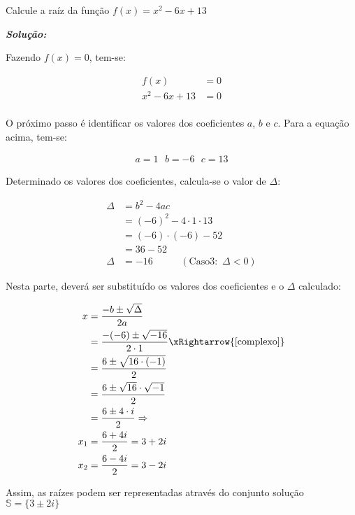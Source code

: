 \begin{example}\label{caso3} Calcule a raíz da função $f(x)=x^2-6x+13$
	
	\textit{\textbf{Solução:}}
	
	Fazendo $f(x)=0$, tem-se:
	\begin{ceqn}
		\begin{align*}
		f(x)&=0 \\
		x^2-6x+13&=0 \\
		\end{align*}
	\end{ceqn}
	
	O próximo passo é identificar os valores dos coeficientes $a$, $b$ e $c$. Para a equação acima, tem-se:
	
	\begin{ceqn}
		\begin{align*}
		a=1 \,\,\,\, b=-6 \,\,\,\, c=13
		\end{align*}		
	\end{ceqn}
	
	Determinado os valores dos coeficientes, calcula-se o valor de $\Delta$:
	
	\begin{ceqn}
		\begin{align*}
		\Delta &= b^2-4ac \\
		&=(-6)^2-4 \cdot 1 \cdot 13 \\
		&= (-6)\cdot (-6)-52 \\
		&= 36 - 52 \\
		\Delta &=-16 \,\,\,\,\,\,\,\,\,\,\,\,\,\,\,\,\, (\mathrm{Caso 3:}\,\, \Delta<0)
		\end{align*}
	\end{ceqn}
	
	Nesta parte, deverá ser substituído os valores dos coeficientes e o $\Delta$ calculado:
	
	\begin{ceqn}
	\begin{align*}
	x &= \frac{-b\pm \sqrt{\Delta}}{2a} \\
	&= \frac{-(-6)\pm \sqrt{-16}}{2\cdot 1} \xRightarrow{\text{\ref{complexo}}} \\
	&= \frac{6 \pm \sqrt{16 \cdot (-1)}}{2} \\
	&= \frac{6\pm \sqrt{16} \cdot \sqrt{-1}}{2} \\
	&= \frac{6\pm 4 \cdot i}{2} \Rightarrow \\
	x_1 &= \frac{6+4i}{2} = 3+2i \\
	x_2 &= \frac{6-4i}{2} = 3-2i \\
	\end{align*}
\end{ceqn}

	Assim, as raízes podem ser representadas através do conjunto solução $\mathbb{S}=\{3 \pm 2i\}$
	
\end{example}

